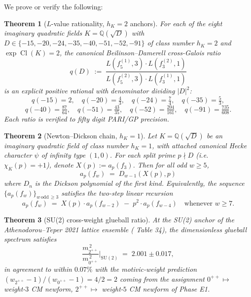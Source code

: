 \documentclass[11pt]{amsart}
\newtheorem{theorem}{Theorem}
\theoremstyle{definition}
\theoremstyle{remark}
\DeclareMathOperator{\Cl}{Cl}
\newcommand{\Q}{\mathbb{Q}}
\newcommand{\chiK}{\chi_K}
\begin{document}
We prove or verify the following:

\begin{theorem}[$L$-value rationality, $h_K = 2$ anchors]\label{thm:beilinson-qD}
For each of the eight imaginary quadratic fields $K = \Q(\sqrt{D})$ with $D \in
\{-15, -20, -24, -35, -40, -51, -52, -91\}$ of class number $h_K = 2$
and $\exp\Cl(K) = 2$, the canonical Beilinson--Damerell cross-Galois ratio
\[
q(D) \;:=\; \frac{L(f_5^{(1)}, 3) \cdot L(f_3^{(2)}, 1)}
{L(f_5^{(2)}, 3) \cdot L(f_3^{(1)}, 1)}
\]
is an explicit positive rational with denominator dividing $|D|^{2}$:
\[
q(-15) = 2, \quad q(-20) = \tfrac{4}{3}, \quad q(-24) = \tfrac{7}{4}, \quad
q(-35) = \tfrac{5}{3},
\]
\[
q(-40) = \tfrac{87}{64}, \quad q(-51) = \tfrac{43}{35}, \quad q(-52) =
\tfrac{204}{161}, \quad q(-91) = \tfrac{735}{608}.
\]
Each ratio is verified to fifty digit PARI/GP precision.
\end{theorem}

\begin{theorem}[Newton--Dickson chain, $h_K = 1$]\label{thm:newton-dickson}
Let $K = \Q(\sqrt{D})$ be an imaginary quadratic field of class number
$h_K = 1$, with attached canonical Hecke character $\psi$ of infinity type
$(1, 0)$. For each split prime $p \nmid D$ (i.e.\ $\chiK(p) = +1$), denote
$X(p) := a_p(f_3)$. Then for all odd $w \ge 5$,
\[
a_p(f_w) \;=\; D_{w-1}(X(p), p)
\]
where $D_n$ is the Dickson polynomial of the first kind. Equivalently,
the sequence $\{a_p(f_w)\}_{w \,\mathrm{odd}\, \ge 3}$ satisfies the
two-step linear recursion
\[
a_p(f_w) \;=\; X(p)\cdot a_p(f_{w-2}) \;-\; p^2 \cdot a_p(f_{w-4})
\quad\text{whenever } w \ge 7.
\]
\end{theorem}

\begin{theorem}[SU(2) cross-weight glueball ratio]\label{thm:su2-ratio}
At the SU(2) anchor of the Athenodorou--Teper 2021 lattice ensemble
(\cite{Athenodorou2021} Table 34), the dimensionless glueball spectrum
satisfies
\[
\frac{m_{2^{++}}^{\,2}}{m_{0^{++}}^{\,2}} \Bigg|_{\mathrm{SU(2)}}
\;=\; 2.001 \pm 0.017,
\]
in agreement to within $0.07\%$ with the motivic-weight prediction
$(w_{2^{++}} - 1)/(w_{0^{++}} - 1) = 4/2 = 2$ coming from the assignment
$0^{++} \mapsto $ weight-$3$ CM newform, $2^{++} \mapsto $ weight-$5$ CM
newform of Phase E1.
\end{theorem}
\end{document}
